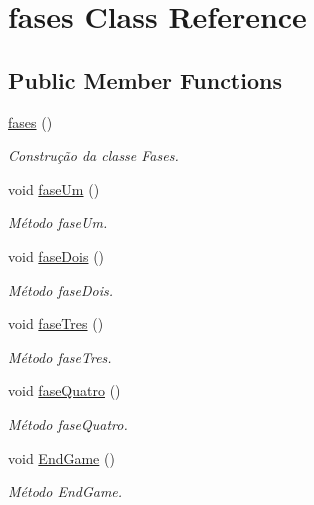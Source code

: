 \hypertarget{classfases}{}\section{fases Class Reference}
\label{classfases}
\subsection*{Public Member Functions}
\begin{DoxyCompactItemize}
\item 
\mbox{\hyperlink{classfases_a39d5b42a40a958d25411c51cb2b0959c}{fases}} ()
\begin{DoxyCompactList}\small\item\em Construção da classe Fases. \end{DoxyCompactList}\item 
void \mbox{\hyperlink{classfases_a89059232b76460277f9846fc6d66488c}{fase\+Um}} ()
\begin{DoxyCompactList}\small\item\em Método fase\+Um. \end{DoxyCompactList}\item 
void \mbox{\hyperlink{classfases_a2f19632bd94eacd6c5437a2774bc529f}{fase\+Dois}} ()
\begin{DoxyCompactList}\small\item\em Método fase\+Dois. \end{DoxyCompactList}\item 
void \mbox{\hyperlink{classfases_a05138769008d5c7d1b548916ecfa9f34}{fase\+Tres}} ()
\begin{DoxyCompactList}\small\item\em Método fase\+Tres. \end{DoxyCompactList}\item 
void \mbox{\hyperlink{classfases_af33d3aefdf442b1ea726645b0c946d78}{fase\+Quatro}} ()
\begin{DoxyCompactList}\small\item\em Método fase\+Quatro. \end{DoxyCompactList}\item 
void \mbox{\hyperlink{classfases_aa05ea0c25d2c70ee022f56f02003b4b5}{End\+Game}} ()
\begin{DoxyCompactList}\small\item\em Método End\+Game. \end{DoxyCompactList}\end{DoxyCompactItemize}


